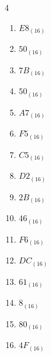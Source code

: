 \begin{multicols}{4}
\begin{enumerate}
  \item $E8_{(16)}$

        \phantom{$=232$}

  \item $50_{(16)}$

        \phantom{$=80$}

  \item $7B_{(16)}$

        \phantom{$=123$}

  \item $50_{(16)}$

        \phantom{$=80$}

  \item $A7_{(16)}$

        \phantom{$=167$}

  \item $F5_{(16)}$

        \phantom{$=245$}

\columnbreak %

  \item $C5_{(16)}$

        \phantom{$=197$}

  \item $D2_{(16)}$

        \phantom{$=210$}

  \item $2B_{(16)}$

        \phantom{$=43$}

  \item $46_{(16)}$

        \phantom{$=70$}

  \item $F6_{(16)}$

        \phantom{$=246$}

  \item $DC_{(16)}$

        \phantom{$=220$}

  \item $61_{(16)}$

        \phantom{$=97$}

  \item $8_{(16)}$

        \phantom{$=8$}

  \item $80_{(16)}$

        \phantom{$=128$}

  \item $4F_{(16)}$


\end{enumerate}
\end{multicols}
